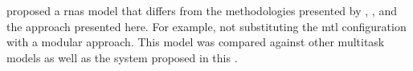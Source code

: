 
\textcite{mcleod2021modular} proposed a \glspl{rna} model
that differs from the methodologies presented by
\textcite{chen2021attend}, \textcite{micchi2021deep}, and
the approach presented here. For example, not substituting
the \gls{mtl} configuration with a modular approach. This
model was compared against other multitask models as well as
the system proposed in this \thesisdiss{}.
